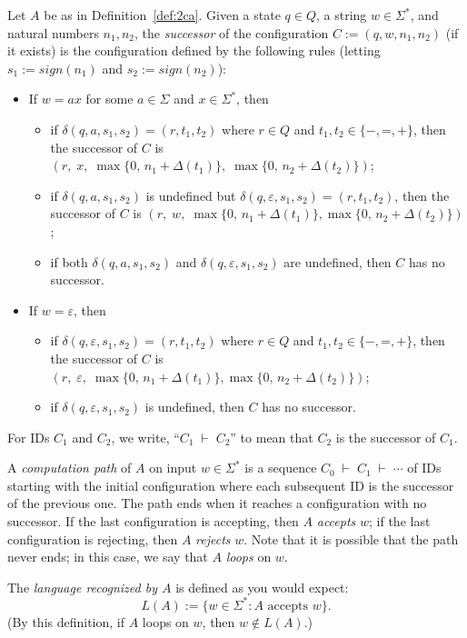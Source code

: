\documentclass[11pt]{article}
\newcommand{\emptystr}{\varepsilon}
\newcommand{\sye}{\mathord{=}}
\newcommand{\syp}{\mathord{+}}
\newcommand{\sym}{\mathord{-}}
\newcommand{\step}{\;\vdash\;}
\newcommand{\sign}{\mathord{\textit{sign}}}
\theoremstyle{definition}
\begin{document}
Let $A$ be as in Definition~\ref{def:2ca}.  Given a state $q\in Q$, a string $w\in\Sigma^*$, and natural numbers $n_1,n_2$, the \emph{successor} of the configuration $C := (q,w,n_1,n_2)$ (if it exists) is the configuration defined by the following rules (letting $s_1 := \sign(n_1)$ and $s_2 := \sign(n_2)$):
\begin{itemize}
\item
If $w=ax$ for some $a\in\Sigma$ and $x\in\Sigma^*$, then
\begin{itemize}
\item
if $\delta(q,a,s_1,s_2) = (r,t_1,t_2)$ where $r\in Q$ and $t_1,t_2\in\{\sym,\sye,\syp\}$, then the successor of $C$ is $(r,\; x,\;\max\{0,\,n_1+\Delta(t_1)\},\;\max\{0,\,n_2+\Delta(t_2)\})$;
\item
if $\delta(q,a,s_1,s_2)$ is undefined but $\delta(q,\emptystr,s_1,s_2) = (r,t_1,t_2)$, then the successor of $C$ is $(r,\; w,\;\max\{0,\,n_1+\Delta(t_1)\},\max\{0,\,n_2+\Delta(t_2)\})$;
\item
if both $\delta(q,a,s_1,s_2)$ and $\delta(q,\emptystr,s_1,s_2)$ are undefined, then $C$ has no successor.
\end{itemize}
\item
If $w = \emptystr$, then
\begin{itemize}
\item
if $\delta(q,\emptystr,s_1,s_2) = (r,t_1,t_2)$ where $r\in Q$ and $t_1,t_2\in\{\sym,\sye,\syp\}$, then the successor of $C$ is $(r,\;\emptystr,\;\max\{0,\,n_1+\Delta(t_1)\},\max\{0,\,n_2+\Delta(t_2)\})$;
\item
if $\delta(q,\emptystr,s_1,s_2)$ is undefined, then $C$ has no successor.
\end{itemize}
\end{itemize}
For IDs $C_1$ and $C_2$, we write, ``$C_1\step C_2$'' to mean that $C_2$ is the successor of $C_1$.

A \emph{computation path} of $A$ on input $w\in\Sigma^*$ is a sequence $C_0\step C_1\step \cdots$ of IDs starting with the initial configuration where each subsequent ID is the successor of the previous one.  The path ends when it reaches a configuration with no successor.  If the last configuration is accepting, then $A$ \emph{accepts} $w$; if the last configuration is rejecting, then $A$ \emph{rejects} $w$.  Note that it is possible that the path never ends; in this case, we say that $A$ \emph{loops} on $w$.

The \emph{language recognized by $A$} is defined as you would expect:
\[ L(A) := \{ w\in\Sigma^* : \mbox{$A$ accepts $w$} \}. \]
(By this definition, if $A$ loops on $w$, then $w\notin L(A)$.)
\end{document}
